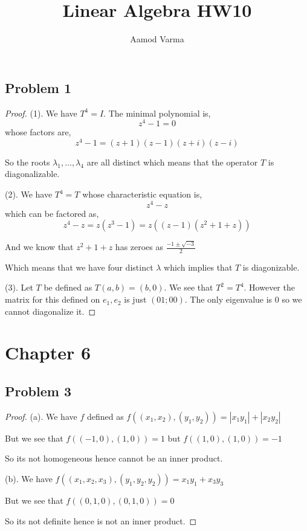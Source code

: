 \documentclass[a4paper]{report}
\title{Linear Algebra HW10}
\author{Aamod Varma}
\begin{document}
\maketitle
\date{}

\subsection*{Problem 1}
\begin{proof}
   (1). We have $T^{4} = I$. The minimal polynomial is, 
   $$ z^{4} - 1 = 0 $$ whose factors are, 
   $$ z^{4} - 1 = (z + 1)(z - 1)(z + i)(z - i) $$ 

   So the roots $\lambda_1,\dots,\lambda_4$ are all distinct which means that the operator $T$ is diagonalizable.

   (2). We have $T^{4} = T$ whose characteristic equation is, 
   $$ z^{4} - z $$ which can be factored as, 
   $$ z^{4} - z = z ( z^{3} - 1)  = z( (z - 1 )(z^{2} + 1 + z ))$$ 

   And we know that $z^2 + 1 + z$ has zeroes as $\frac{ -1 \pm \sqrt{-3} }{2}$ 

   Which means that we have four distinct $\lambda$ which implies that $T$ is diagonizable. 


   (3). Let $T$ be defined as  $T(a,b) = (b,0)$. We see that  $T^2 = T^{4}$. However the matrix for this defined on $e_1,e_2$ is just $(0 1; 0 0)$. The only eigenvalue is  $0$ so we cannot diagonalize it.
\end{proof}


\section*{Chapter 6}
\subsection*{Problem 3}
\begin{proof}
   (a). We have $f$ defined as $f((x_1,x_2),(y_1,y_2)) = |x_1y_1| + |x_2y_2|$

   But we see that $f((-1,0),(1,0)) = 1$ but  $f((1,0),(1,0)) = -1$

   So its not homogeneous hence cannot be an inner product.

   (b). We have  $f((x_1,x_2,x_3),(y_1,y_2,y_2)) = x_1y_1 + x_3y_3$

   But we see that $f((0,1,0),(0,1,0)) = 0$

   So its not definite hence is not an inner product.
\end{proof}
\end{document}
